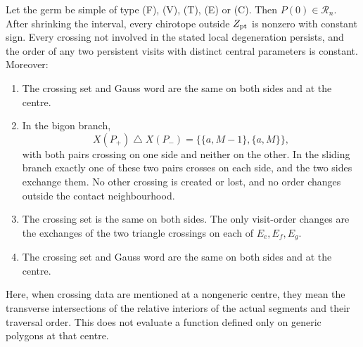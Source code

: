 \begin{lemma}\label{lem:wall-sides}
Let the germ be simple of type (F), (V), (T), (E) or (C). Then
$P(0)\in\mathcal R_n$. After shrinking the interval, every chirotope outside
$Z_{\rm pt}$ is nonzero with constant sign. Every crossing not involved in
the stated local degeneration persists, and the order of any two persistent
visits with distinct central parameters is constant. Moreover:
\begin{enumerate}
\item[(F)] The crossing set and Gauss word are the same on both sides and
at the centre.
\item[(V)] In the bigon branch,
\[
 X(P_+)\mathbin\triangle X(P_-)=\{\{a,M-1\},\{a,M\}\},
\]
with both pairs crossing on one side and neither on the other. In the sliding
branch exactly one of these two pairs crosses on each side, and the two sides
exchange them. No other crossing is created or lost, and no order changes
outside the contact neighbourhood.
\item[(T)] The crossing set is the same on both sides. The only visit-order
changes are the exchanges of the two triangle crossings on each of
$E_e,E_f,E_g$.
\item[(E),(C)] The crossing set and Gauss word are the same on both sides
and at the centre.
\end{enumerate}
Here, when crossing data are mentioned at a nongeneric centre, they mean the
transverse intersections of the relative interiors of the actual segments and
their traversal order. This does not evaluate a function defined only on
generic polygons at that centre.
\end{lemma}
